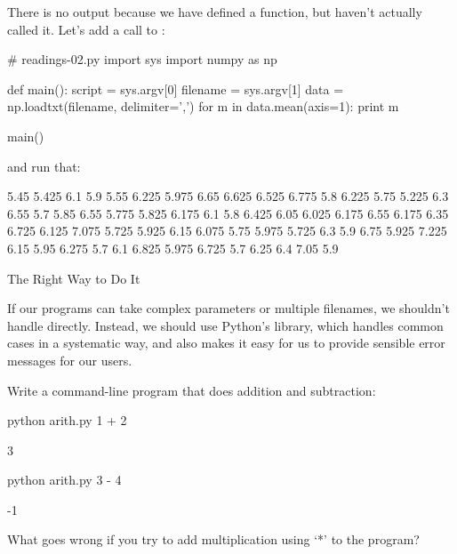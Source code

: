 There is no output because we have defined a function, but haven't
actually called it. Let's add a call to :

\begin{VerbIn}
# readings-02.py
import sys
import numpy as np

def main():
    script = sys.argv[0]
    filename = sys.argv[1]
    data = np.loadtxt(filename, delimiter=',')
    for m in data.mean(axis=1):
        print m

main()
\end{VerbIn}

and run that:


\begin{VerbOut}
5.45
5.425
6.1
5.9
5.55
6.225
5.975
6.65
6.625
6.525
6.775
5.8
6.225
5.75
5.225
6.3
6.55
5.7
5.85
6.55
5.775
5.825
6.175
6.1
5.8
6.425
6.05
6.025
6.175
6.55
6.175
6.35
6.725
6.125
7.075
5.725
5.925
6.15
6.075
5.75
5.975
5.725
6.3
5.9
6.75
5.925
7.225
6.15
5.95
6.275
5.7
6.1
6.825
5.975
6.725
5.7
6.25
6.4
7.05
5.9
\end{VerbOut}

\begin{swcbox}{The Right Way to Do It}

If our programs can take complex parameters or multiple filenames, we
shouldn't handle  directly. Instead, we should use
Python's  library, which handles common cases in a
systematic way, and also makes it easy for us to provide sensible error
messages for our users.

\end{swcbox}

\begin{challenge}
  Write a command-line program that does addition and subtraction:
\begin{VerbIn}
python arith.py 1 + 2
\end{VerbIn}
\begin{VerbOut}
3
\end{VerbOut}
\begin{VerbIn}
python arith.py 3 - 4
\end{VerbIn}
\begin{VerbOut}
-1
\end{VerbOut}
  What goes wrong if you try to add multiplication using `*' to the
  program?
\end{challenge}

